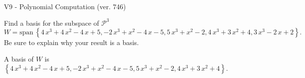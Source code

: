 \begin{exercise}
  \begin{exerciseTitle}V9 - Polynomial Computation (ver. 746)\end{exerciseTitle}
  \begin{exerciseStatement}
    Find a basis for the subspace of \(\mathcal{P}^3\) 
\[W=\mathrm{span}\ \left\{4 \, x^{3} + 4 \, x^{2} - 4 \, x + 5 , -2 \, x^{3} + x^{2} - 4 \, x - 5 , 5 \, x^{3} + x^{2} - 2 , 4 \, x^{3} + 3 \, x^{2} + 4 , 3 \, x^{3} - 2 \, x + 2\right\}.\]
 Be sure to explain why your result is a basis.


  \end{exerciseStatement}
  \begin{exerciseAnswer}
   A basis of \(W\) is  \(\left\{4 \, x^{3} + 4 \, x^{2} - 4 \, x + 5 , -2 \, x^{3} + x^{2} - 4 \, x - 5 , 5 \, x^{3} + x^{2} - 2 , 4 \, x^{3} + 3 \, x^{2} + 4\right\}\).
  


  \end{exerciseAnswer}
\end{exercise}